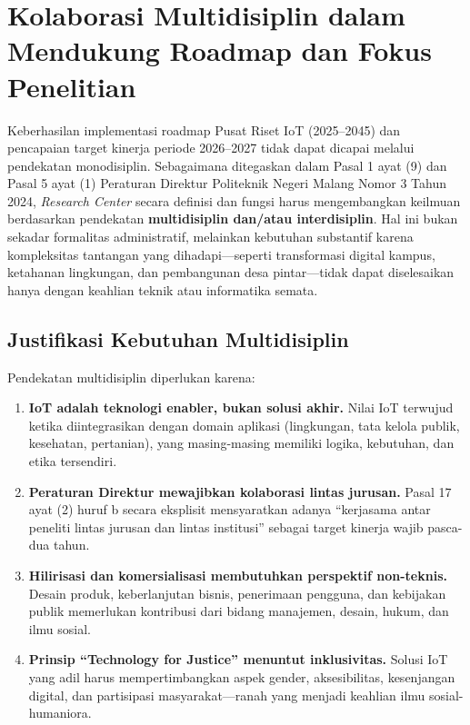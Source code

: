 \documentclass[12pt,a4paper]{article}
\begin{document}
\section{Kolaborasi Multidisiplin dalam Mendukung Roadmap dan Fokus Penelitian}

Keberhasilan implementasi roadmap Pusat Riset IoT (2025–2045) dan pencapaian target kinerja periode 2026–2027 tidak dapat dicapai melalui pendekatan monodisiplin. Sebagaimana ditegaskan dalam Pasal 1 ayat (9) dan Pasal 5 ayat (1) Peraturan Direktur Politeknik Negeri Malang Nomor 3 Tahun 2024, \textit{Research Center} secara definisi dan fungsi harus mengembangkan keilmuan berdasarkan pendekatan \textbf{multidisiplin dan/atau interdisiplin}. Hal ini bukan sekadar formalitas administratif, melainkan kebutuhan substantif karena kompleksitas tantangan yang dihadapi—seperti transformasi digital kampus, ketahanan lingkungan, dan pembangunan desa pintar—tidak dapat diselesaikan hanya dengan keahlian teknik atau informatika semata.

\subsection{Justifikasi Kebutuhan Multidisiplin}

Pendekatan multidisiplin diperlukan karena:
\begin{enumerate}[leftmargin=*]
    \item \textbf{IoT adalah teknologi enabler, bukan solusi akhir.} Nilai IoT terwujud ketika diintegrasikan dengan domain aplikasi (lingkungan, tata kelola publik, kesehatan, pertanian), yang masing-masing memiliki logika, kebutuhan, dan etika tersendiri.
    \item \textbf{Peraturan Direktur mewajibkan kolaborasi lintas jurusan.} Pasal 17 ayat (2) huruf b secara eksplisit mensyaratkan adanya “kerjasama antar peneliti lintas jurusan dan lintas institusi” sebagai target kinerja wajib pasca-dua tahun.
    \item \textbf{Hilirisasi dan komersialisasi membutuhkan perspektif non-teknis.} Desain produk, keberlanjutan bisnis, penerimaan pengguna, dan kebijakan publik memerlukan kontribusi dari bidang manajemen, desain, hukum, dan ilmu sosial.
    \item \textbf{Prinsip “Technology for Justice” menuntut inklusivitas.} Solusi IoT yang adil harus mempertimbangkan aspek gender, aksesibilitas, kesenjangan digital, dan partisipasi masyarakat—ranah yang menjadi keahlian ilmu sosial-humaniora.
\end{enumerate}
\end{document}
